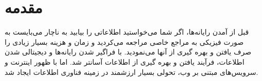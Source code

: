 \chapter*{مقدمه}

قبل از آمدن رایانه‌ها، اگر شما می‌خواستید اطلاعاتی را بیابید به ناچار می‌بایست به صورت فیزیکی به مراجع خاصی مراجعه می‌کردید و زمان و هزینه بسیار زیادی را صرف یافتن و بهره گیری از آنها می‌نمودید. با فراگیر شدن رایانه‌ها و دیجیتالی شدن اطلاعات، فرآیند یافتن و بهره گیری از اطلاعات آسانتر شد. اما با ظهور اینترنت و سرویس‌های مبتنی بر وب، تحولی بسیار ارزشمند در زمینه فناوری اطلاعات ایجاد شد.

